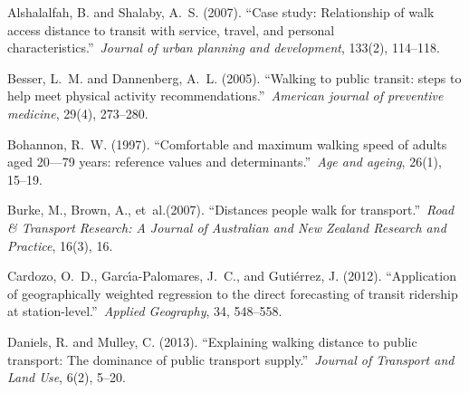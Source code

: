 \documentclass[sustainability,article,submit,moreauthors,pdftex,10pt,a4paper]{Definitions/mdpi}
\begin{document}




\begin{thebibliography}{999}
	
	Alshalalfah, B. and Shalaby, A.~S. (2007).
	\newblock ``Case study: Relationship of walk access distance to transit with
	service, travel, and personal characteristics.''\ {\em Journal of urban
		planning and development}, 133(2), 114--118.
	
	Besser, L.~M. and Dannenberg, A.~L. (2005).
	\newblock ``Walking to public transit: steps to help meet physical activity
	recommendations.''\ {\em American journal of preventive medicine}, 29(4),
	273--280.
	
	Bohannon, R.~W. (1997).
	\newblock ``Comfortable and maximum walking speed of adults aged 20—79 years:
	reference values and determinants.''\ {\em Age and ageing}, 26(1), 15--19.
	
	Burke, M., Brown, A., et~al.\@ (2007).
	\newblock ``Distances people walk for transport.''\ {\em Road \& Transport
		Research: A Journal of Australian and New Zealand Research and Practice},
	16(3), 16.
	
	Cardozo, O.~D., Garc{\'\i}a-Palomares, J.~C., and Guti{\'e}rrez, J. (2012).
	\newblock ``Application of geographically weighted regression to the direct
	forecasting of transit ridership at station-level.''\ {\em Applied
		Geography}, 34, 548--558.
	
	Daniels, R. and Mulley, C. (2013).
	\newblock ``Explaining walking distance to public transport: The dominance of
	public transport supply.''\ {\em Journal of Transport and Land Use}, 6(2),
	5--20.
	

\end{thebibliography}
\end{document}
